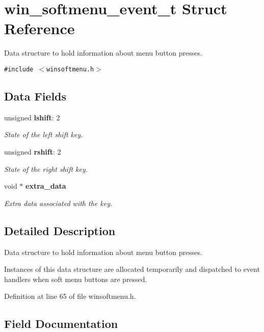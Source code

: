 \section{win\_\-softmenu\_\-event\_\-t Struct Reference}
\label{structwin__softmenu__event__t}
Data structure to hold information about menu button presses.  


{\tt \#include $<$winsoftmenu.h$>$}

\subsection*{Data Fields}
\begin{CompactItemize}
\item 
unsigned {\bf lshift}: 2
\begin{CompactList}\small\item\em State of the left shift key. \item\end{CompactList}\item 
unsigned {\bf rshift}: 2
\begin{CompactList}\small\item\em State of the right shift key. \item\end{CompactList}\item 
void $\ast$ {\bf extra\_\-data}
\begin{CompactList}\small\item\em Extra data associated with the key. \item\end{CompactList}\end{CompactItemize}


\subsection{Detailed Description}
Data structure to hold information about menu button presses. 

Instances of this data structure are allocated temporarily and dispatched to event handlers when soft menu buttons are pressed. 



Definition at line 65 of file winsoftmenu.h.

\subsection{Field Documentation}
